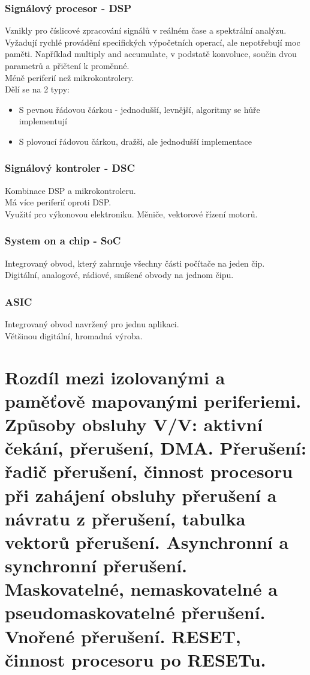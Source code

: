 \subsubsection*{Signálový procesor - DSP}
Vznikly pro číslicové zpracování signálů v reálném čase a spektrální analýzu. \\
Vyžadují rychlé provádění specifických výpočetních operací, ale nepotřebují moc paměti. Například multiply and accumulate, v podstatě konvoluce, součin dvou parametrů a přičtení k proměnné.\\
Méně periferií než mikrokontrolery. \\
Dělí se na 2 typy:
\begin{itemize}
    \item S pevnou řádovou čárkou - jednodušší, levnější, algoritmy se hůře implementují
    \item S plovoucí řádovou čárkou, dražší, ale jednodušší implementace
\end{itemize}

\subsubsection*{Signálový kontroler - DSC}
Kombinace DSP a mikrokontroleru.\\
Má více periferií oproti DSP. \\
Využití pro výkonovou elektroniku. Měniče, vektorové řízení motorů.\\

\subsubsection*{System on a chip - SoC}
Integrovaný obvod, který zahrnuje všechny části počítače na jeden čip. \\
Digitální, analogové, rádiové, smíšené obvody na jednom čipu. \\

\subsubsection*{ASIC}
Integrovaný obvod navržený pro jednu aplikaci.\\
Většinou digitální, hromadná výroba.\\


\section{Rozdíl mezi izolovanými a paměťově mapovanými periferiemi. Způsoby obsluhy V/V: aktivní čekání, přerušení, DMA.
  Přerušení: řadič přerušení, činnost procesoru při zahájení obsluhy přerušení a návratu z přerušení, tabulka vektorů přerušení. Asynchronní a synchronní přerušení. Maskovatelné, nemaskovatelné a pseudomaskovatelné přerušení. Vnořené přerušení. RESET, činnost procesoru po RESETu.}
